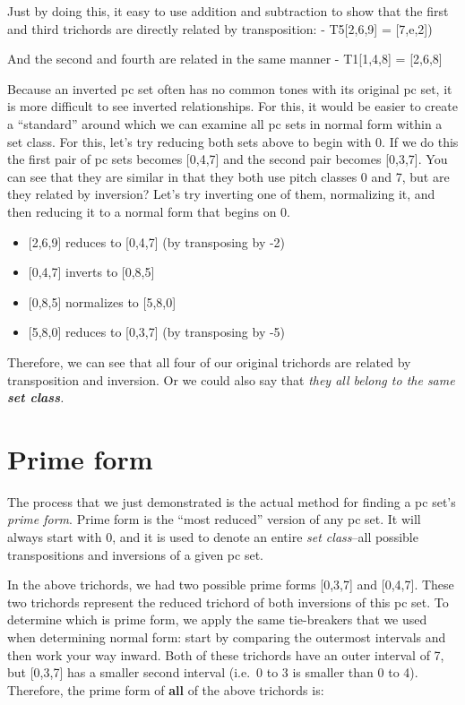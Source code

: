 \documentclass{book}
\providecommand{\tightlist}{%
  \setlength{\itemsep}{0pt}\setlength{\parskip}{0pt}}
\begin{document}
Just by doing this, it easy to use addition and subtraction to show that the
first and third trichords are directly related by transposition: -
T5{[}2,6,9{]} = {[}7,e,2{]})

And the second and fourth are related in the same manner - T1{[}1,4,8{]} =
{[}2,6,8{]}

Because an inverted pc set often has no common tones with its original pc set,
it is more difficult to see inverted relationships. For this, it would be
easier to create a ``standard'' around which we can examine all pc sets in
normal form within a set class. For this, let's try reducing both sets above
to begin with 0. If we do this the first pair of pc sets becomes {[}0,4,7{]}
and the second pair becomes {[}0,3,7{]}. You can see that they are similar in
that they both use pitch classes 0 and 7, but are they related by inversion?
Let's try inverting one of them, normalizing it, and then reducing it to a
normal form that begins on 0.

\begin{itemize}
\tightlist
\item
  {[}2,6,9{]} reduces to {[}0,4,7{]} (by transposing by -2)
\item
  {[}0,4,7{]} inverts to {[}0,8,5{]}
\item
  {[}0,8,5{]} normalizes to {[}5,8,0{]}
\item
  {[}5,8,0{]} reduces to {[}0,3,7{]} (by transposing by -5)
\end{itemize}

Therefore, we can see that all four of our original trichords are related by
transposition and inversion. Or we could also say that \emph{they all belong
to the same \textbf{set class}.}

\hypertarget{prime-form}{%
\section{Prime form}\label{prime-form}}

The process that we just demonstrated is the actual method for finding a pc
set's \emph{prime form}. Prime form is the ``most reduced'' version of any pc
set. It will always start with 0, and it is used to denote an entire \emph{set
class}--all possible transpositions and inversions of a given pc set.

In the above trichords, we had two possible prime forms {[}0,3,7{]} and
{[}0,4,7{]}. These two trichords represent the reduced trichord of both
inversions of this pc set. To determine which is prime form, we apply the same
tie-breakers that we used when determining normal form: start by comparing the
outermost intervals and then work your way inward. Both of these trichords
have an outer interval of 7, but {[}0,3,7{]} has a smaller second interval
(i.e.~0 to 3 is smaller than 0 to 4). Therefore, the prime form of
\textbf{all} of the above trichords is:
\end{document}
